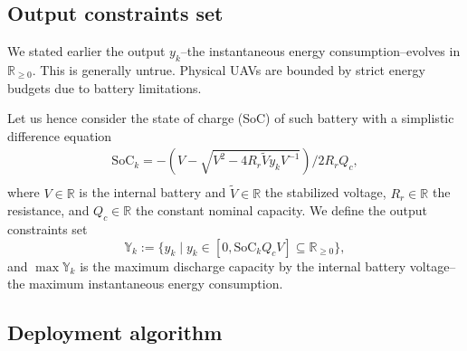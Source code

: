 \documentclass[letterpaper,10pt,conference]{ieeeconf}
\theoremstyle{definition}
\begin{document}
\subsection{Output constraints set}

We stated earlier the output $y_k$--the instantaneous energy consumption--evolves in $\mathbb{R}_{\geq 0}$. This is generally untrue. Physical UAVs are bounded by strict energy budgets due to battery limitations.

Let us hence consider the state of charge (SoC) of such battery with a simplistic difference equation~\cite{seewald2020mechanical}
\begin{equation}\begin{split}
  \mathrm{SoC}_k=-\left(V-
  \sqrt{
    V^2-
    4R_r\tilde{V}y_kV^{-1}}
  \right)/2R_rQ_c,\\ 
\end{split}\end{equation}
where $V\in\mathbb{R}$ is the internal battery and $\tilde{V}\in\mathbb{R}$ the stabilized voltage, $R_r\in\mathbb{R}$ the resistance, and $Q_c\in\mathbb{R}$ the constant nominal capacity. We define the output constraints set
\begin{equation}
  \mathbb{Y}_k:=\{y_k\mid y_k\in[0,\mathrm{SoC}_kQ_cV]\subseteq{\mathbb{R}_{\geq 0}}\},
\end{equation}
and $\max{\mathbb{Y}}_k$ is the maximum discharge capacity by the internal battery voltage--the maximum instantaneous energy consumption.

\subsection{Deployment algorithm}
\end{document}
